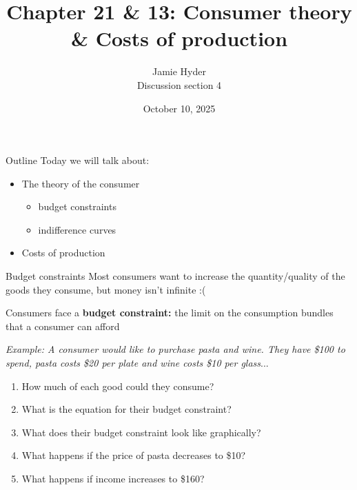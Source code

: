 \documentclass[compress]{beamer}
\title{Chapter 21 \& 13: Consumer theory \& Costs of production}
\author{Jamie Hyder \\
    Discussion section 4}
\date{October 10, 2025}
\begin{document}
\begin{frame}
    \titlepage 
\end{frame}

\begin{frame}{Outline}
    Today we will talk about:
    \begin{itemize}
        \item The theory of the consumer
        \begin{itemize}
            \item budget constraints
            \item indifference curves
        \end{itemize}
        \item Costs of production
    \end{itemize}
\end{frame}

\begin{frame}{Budget constraints}
Most consumers want to increase the quantity/quality of the goods they consume, but money isn't infinite :(

\begin{block}{Consumers face a \textbf{budget constraint:}}
    the limit on the consumption bundles that a consumer can afford
\end{block}
    \vspace{3mm}
\textit{Example: A consumer would like to purchase pasta and wine. They have \$100 to spend, pasta costs \$20 per plate and wine costs \$10 per glass}...
\begin{enumerate}
    \item How much of each good could they consume?
    \item What is the equation for their budget constraint?
    \item What does their budget constraint look like graphically?
    \item What happens if the price of pasta decreases to \$10?
    \item What happens if income increases to \$160?
\end{enumerate}
\end{frame}
\end{document}
